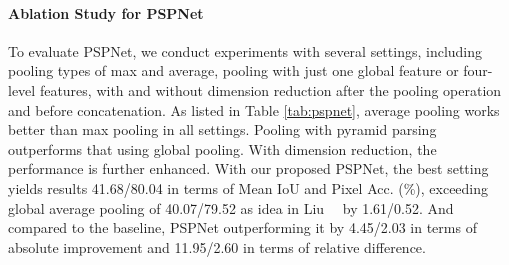 \documentclass[10pt,twocolumn,letterpaper]{article}
\begin{document}
\paragraph{Ablation Study for PSPNet}
To evaluate PSPNet, we conduct experiments with several settings, including pooling types
of max and average, pooling with just one global feature or four-level features, with and
without dimension reduction after the pooling operation and before concatenation. As
listed in Table \ref{tab:pspnet}, average pooling works better than max pooling in all
settings. Pooling with pyramid parsing outperforms that using global pooling. With
dimension reduction, the performance is further enhanced. With our proposed PSPNet, the
best setting yields results 41.68/80.04 in terms of Mean IoU and Pixel Acc. (\%), exceeding
global average pooling of 40.07/79.52 as idea in Liu~\etal~\cite{liu2015parsenet} by 1.61/0.52.
And compared to the baseline, PSPNet outperforming it by 4.45/2.03 in terms of absolute
improvement and 11.95/2.60 in terms of relative difference.
\end{document}
